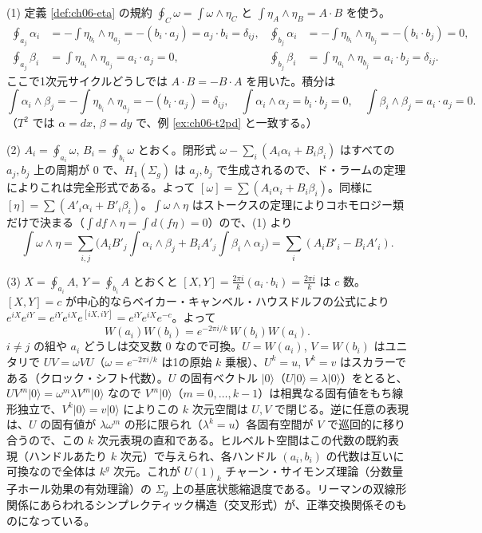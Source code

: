 \begin{solution}
(1) 定義 \ref{def:ch06-eta} の規約 $\oint_C\omega=\int\omega\wedge\eta_C$ と $\int\eta_A\wedge\eta_B=A\cdot B$ を使う。
\begin{align*}
\oint_{a_j}\alpha_i&=-\int\eta_{b_i}\wedge\eta_{a_j}=-(b_i\cdot a_j)=a_j\cdot b_i=\delta_{ij},&
\oint_{b_j}\alpha_i&=-\int\eta_{b_i}\wedge\eta_{b_j}=-(b_i\cdot b_j)=0,\\
\oint_{a_j}\beta_i&=\int\eta_{a_i}\wedge\eta_{a_j}=a_i\cdot a_j=0,&
\oint_{b_j}\beta_i&=\int\eta_{a_i}\wedge\eta_{b_j}=a_i\cdot b_j=\delta_{ij}.
\end{align*}
ここで1次元サイクルどうしでは $A\cdot B=-B\cdot A$ を用いた。積分は
\[
\int\alpha_i\wedge\beta_j=-\int\eta_{b_i}\wedge\eta_{a_j}=-(b_i\cdot a_j)=\delta_{ij},\quad
\int\alpha_i\wedge\alpha_j=b_i\cdot b_j=0,\quad\int\beta_i\wedge\beta_j=a_i\cdot a_j=0 .
\]
（$T^2$ では $\alpha=dx$, $\beta=dy$ で、例 \ref{ex:ch06-t2pd} と一致する。）

(2) $A_i=\oint_{a_i}\omega$, $B_i=\oint_{b_i}\omega$ とおく。閉形式 $\omega-\sum_i(A_i\alpha_i+B_i\beta_i)$ はすべての $a_j,b_j$ 上の周期が $0$ で、$H_1(\Sigma_g)$ は $a_j,b_j$ で生成されるので、ド・ラームの定理によりこれは完全形式である。よって $[\omega]=\sum(A_i\alpha_i+B_i\beta_i)$。同様に $[\eta]=\sum(A'_i\alpha_i+B'_i\beta_i)$。$\int\omega\wedge\eta$ はストークスの定理によりコホモロジー類だけで決まる（$\int d f\wedge\eta=\int d(f\eta)=0$）ので、(1) より
\[
\int\omega\wedge\eta=\sum_{i,j}\bigl(A_iB'_j\textstyle\int\alpha_i\wedge\beta_j+B_iA'_j\int\beta_i\wedge\alpha_j\bigr)=\sum_i(A_iB'_i-B_iA'_i).
\]

(3) $X=\oint_{a_i}A$, $Y=\oint_{b_i}A$ とおくと $[X,Y]=\frac{2\pi i}{k}(a_i\cdot b_i)=\frac{2\pi i}{k}$ は $c$ 数。$[X,Y]=c$ が中心的ならベイカー・キャンベル・ハウスドルフの公式により $e^{iX}e^{iY}=e^{iY}e^{iX}e^{[iX,iY]}=e^{iY}e^{iX}e^{-c}$。よって
\[
W(a_i)W(b_i)=e^{-2\pi i/k}\,W(b_i)W(a_i).
\]
$i\neq j$ の組や $a_i$ どうしは交叉数 $0$ なので可換。$U=W(a_i)$, $V=W(b_i)$ はユニタリで $UV=\omega VU$（$\omega=e^{-2\pi i/k}$ は1の原始 $k$ 乗根）、$U^k=u$, $V^k=v$ はスカラーである（クロック・シフト代数）。$U$ の固有ベクトル $\lvert0\rangle$（$U\lvert0\rangle=\lambda\lvert0\rangle$）をとると、$UV^m\lvert0\rangle=\omega^m\lambda V^m\lvert0\rangle$ なので $V^m\lvert0\rangle$（$m=0,\dots,k-1$）は相異なる固有値をもち線形独立で、$V^k\lvert0\rangle=v\lvert0\rangle$ によりこの $k$ 次元空間は $U,V$ で閉じる。逆に任意の表現は、$U$ の固有値が $\lambda\omega^m$ の形に限られ（$\lambda^k=u$）各固有空間が $V$ で巡回的に移り合うので、この $k$ 次元表現の直和である。ヒルベルト空間はこの代数の既約表現（ハンドルあたり $k$ 次元）で与えられ、各ハンドル $(a_i,b_i)$ の代数は互いに可換なので全体は $k^g$ 次元。これが $U(1)_k$ チャーン・サイモンズ理論（分数量子ホール効果の有効理論）の $\Sigma_g$ 上の基底状態縮退度である。リーマンの双線形関係にあらわれるシンプレクティック構造（交叉形式）が、正準交換関係そのものになっている。
\end{solution}

